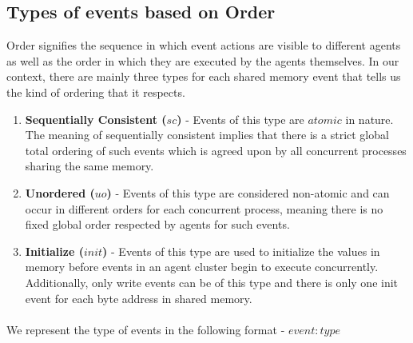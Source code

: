 

    
    \subsection{Types of events based on Order} 
        Order signifies the sequence in which event actions are visible to different agents as well as the order in which they are executed by the agents themselves. In our context, there are mainly three types for each shared memory event that tells us the kind of ordering that it respects. 
        
        \begin{enumerate}
            \item \textbf{Sequentially Consistent ($sc$)} - Events of this type are $atomic$ in nature. The meaning of sequentially consistent implies that there is a strict global total ordering of such events which is agreed upon by all concurrent processes sharing the same memory. 
            
            \item \textbf{Unordered ($uo$)} - Events of this type are considered non-atomic and can occur in different orders for each concurrent process, meaning there is no fixed global order respected by agents for such events. 
            
            \item \textbf{Initialize ($init$)} - Events of this type are used to initialize the values in memory before events in an agent cluster begin to execute concurrently. Additionally, only write events can be of this type and there is only one init event for each byte address in shared memory. 
        \end{enumerate}
        
        \paragraph{}
        We represent the type of events in the following format - $event : type$ 
        
